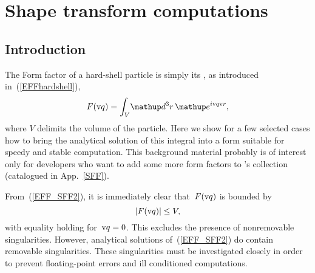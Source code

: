 
\chapter{Shape transform computations}  \label{SFFcomp}


\section{Introduction}

The Form factor of a hard-shell particle is simply its ,
as introduced in~(\ref{EFFhardshell}),
\begin{equation}\label{EFF_SFF2}
  F(\q)=\int_V\!\d^3r\, \e^{i\q\r},
\end{equation}
where $V$ delimits the volume of the particle.
Here we show for a few selected cases
how to bring the analytical solution of this integral into a form
 suitable for speedy and stable computation.
This background material probably is of interest only for
developers who want to add some more form factors to \BornAgain's collection
(catalogued in App.~\ref{SFF}).

%
From~(\ref{EFF_SFF2}), it is immediately clear that~$F(\text{v}{q})$ is bounded by
\begin{equation}
  |F(\text{v}{q})|\le V,
\end{equation}
with equality holding for~$\text{v}{q}=0$.
This excludes the presence of nonremovable singularities.
However, analytical solutions of~(\ref{EFF_SFF2}) do contain
removable singularities.
These singularities must be investigated closely
in order to prevent floating-point errors and ill conditioned computations.


